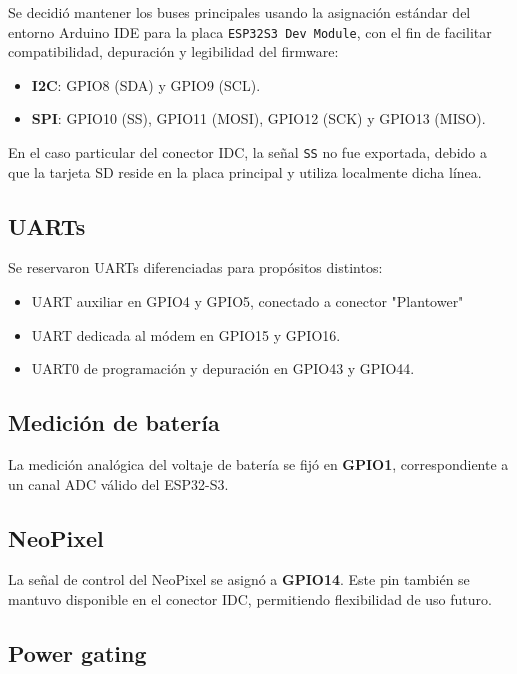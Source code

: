 \documentclass[9pt,a4paper,twocolumn,twoside]{rho-class/rho}
\begin{document}
Se decidió mantener los buses principales usando la asignación estándar del entorno Arduino IDE para la placa \texttt{ESP32S3 Dev Module}, con el fin de facilitar compatibilidad, depuración y legibilidad del firmware:

\begin{itemize}
    \item \textbf{I2C}: GPIO8 (SDA) y GPIO9 (SCL).
    \item \textbf{SPI}: GPIO10 (SS), GPIO11 (MOSI), GPIO12 (SCK) y GPIO13 (MISO).
\end{itemize}

En el caso particular del conector IDC, la señal \texttt{SS} no fue exportada, debido a que la tarjeta SD reside en la placa principal y utiliza localmente dicha línea.

\newpage

\subsection{UARTs}

Se reservaron UARTs diferenciadas para propósitos distintos:

\begin{itemize}
    \item UART auxiliar en GPIO4 y GPIO5, conectado a conector "Plantower"
    \item UART dedicada al módem en GPIO15 y GPIO16.
    \item UART0 de programación y depuración en GPIO43 y GPIO44.
\end{itemize}

\subsection{Medición de batería}

La medición analógica del voltaje de batería se fijó en \textbf{GPIO1}, correspondiente a un canal ADC válido del ESP32-S3.

\subsection{NeoPixel}

La señal de control del NeoPixel se asignó a \textbf{GPIO14}. Este pin también se mantuvo disponible en el conector IDC, permitiendo flexibilidad de uso futuro.

\subsection{Power gating}
\end{document}
